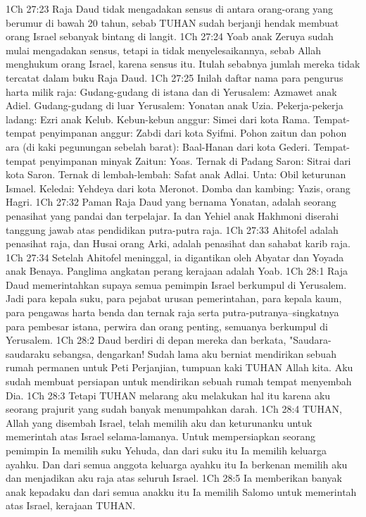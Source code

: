 1Ch 27:23  Raja Daud tidak mengadakan sensus di antara orang-orang yang berumur di bawah 20 tahun, sebab TUHAN sudah berjanji hendak membuat orang Israel sebanyak bintang di langit.
1Ch 27:24  Yoab anak Zeruya sudah mulai mengadakan sensus, tetapi ia tidak menyelesaikannya, sebab Allah menghukum orang Israel, karena sensus itu. Itulah sebabnya jumlah mereka tidak tercatat dalam buku Raja Daud.
1Ch 27:25  Inilah daftar nama para pengurus harta milik raja: Gudang-gudang di istana dan di Yerusalem: Azmawet anak Adiel. Gudang-gudang di luar Yerusalem: Yonatan anak Uzia. Pekerja-pekerja ladang: Ezri anak Kelub. Kebun-kebun anggur: Simei dari kota Rama. Tempat-tempat penyimpanan anggur: Zabdi dari kota Syifmi. Pohon zaitun dan pohon ara (di kaki pegunungan sebelah barat): Baal-Hanan dari kota Gederi. Tempat-tempat penyimpanan minyak Zaitun: Yoas. Ternak di Padang Saron: Sitrai dari kota Saron. Ternak di lembah-lembah: Safat anak Adlai. Unta: Obil keturunan Ismael. Keledai: Yehdeya dari kota Meronot. Domba dan kambing: Yazis, orang Hagri.
1Ch 27:32  Paman Raja Daud yang bernama Yonatan, adalah seorang penasihat yang pandai dan terpelajar. Ia dan Yehiel anak Hakhmoni diserahi tanggung jawab atas pendidikan putra-putra raja.
1Ch 27:33  Ahitofel adalah penasihat raja, dan Husai orang Arki, adalah penasihat dan sahabat karib raja.
1Ch 27:34  Setelah Ahitofel meninggal, ia digantikan oleh Abyatar dan Yoyada anak Benaya. Panglima angkatan perang kerajaan adalah Yoab.
1Ch 28:1  Raja Daud memerintahkan supaya semua pemimpin Israel berkumpul di Yerusalem. Jadi para kepala suku, para pejabat urusan pemerintahan, para kepala kaum, para pengawas harta benda dan ternak raja serta putra-putranya--singkatnya para pembesar istana, perwira dan orang penting, semuanya berkumpul di Yerusalem.
1Ch 28:2  Daud berdiri di depan mereka dan berkata, "Saudara-saudaraku sebangsa, dengarkan! Sudah lama aku berniat mendirikan sebuah rumah permanen untuk Peti Perjanjian, tumpuan kaki TUHAN Allah kita. Aku sudah membuat persiapan untuk mendirikan sebuah rumah tempat menyembah Dia.
1Ch 28:3  Tetapi TUHAN melarang aku melakukan hal itu karena aku seorang prajurit yang sudah banyak menumpahkan darah.
1Ch 28:4  TUHAN, Allah yang disembah Israel, telah memilih aku dan keturunanku untuk memerintah atas Israel selama-lamanya. Untuk mempersiapkan seorang pemimpin Ia memilih suku Yehuda, dan dari suku itu Ia memilih keluarga ayahku. Dan dari semua anggota keluarga ayahku itu Ia berkenan memilih aku dan menjadikan aku raja atas seluruh Israel.
1Ch 28:5  Ia memberikan banyak anak kepadaku dan dari semua anakku itu Ia memilih Salomo untuk memerintah atas Israel, kerajaan TUHAN.
